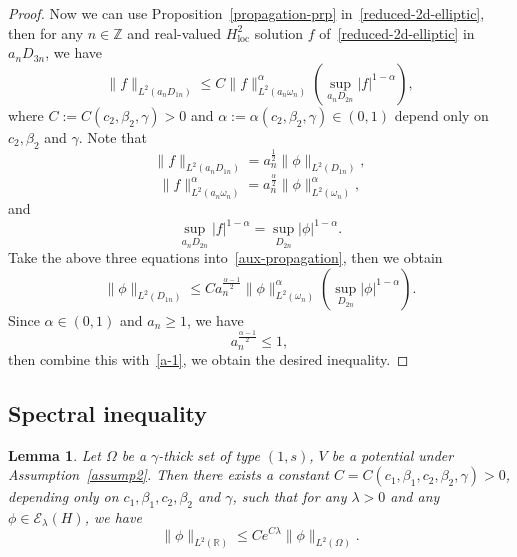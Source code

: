 \documentclass{amsart}
\newcommand\R{\ensuremath{\mathbb{R}}}
\newcommand\Z{\ensuremath{\mathbb{Z}}}
\newtheorem{lemma}[theorem]{Lemma}
\theoremstyle{definition}
\begin{document}
\begin{proof}
	Now we can use Proposition~\ref{propagation-prp} in~\eqref{reduced-2d-elliptic}, then for any $n\in \Z$ and real-valued $H^2_{\mathrm{loc}}$ solution $f$ of~\eqref{reduced-2d-elliptic} in $a_nD_{3n}$, we have
	\begin{equation}
		\|f\|_{L^2(a_nD_{1n})}\le C\|f\|^{\alpha}_{L^2(a_n\omega_n)}\left( \sup_{a_nD_{2n}}|f|^{1-\alpha} \right),\label{aux-propagation} 
	\end{equation}
	where $C:=C(c_2,\beta_2,\gamma)>0$ and $\alpha:=\alpha(c_2,\beta_2,\gamma)\in (0,1)$ depend only on $c_2,\beta_2$ and $\gamma$.
	Note that 
	\begin{equation}
		\|f\|_{L^2(a_nD_{1n})}=a_n^{\frac{1}{2}}\|\phi\|_{L^2(D_{1n})},
	\end{equation}
	\begin{equation}
		\|f\|^{\alpha}_{L^2(a_n \omega_n)}=a_n^{\frac{\alpha}{2}}\|\phi\|^{\alpha}_{L^2(\omega_n)},
	\end{equation}
	and
	\begin{equation}
		\sup_{a_nD_{2n}}|f|^{1-\alpha}=\sup_{D_{2n}}|\phi|^{1-\alpha}.
	\end{equation}
	Take the above three equations into~\eqref{aux-propagation}, then we obtain 
	\begin{equation}\label{a-1}
		\|\phi\|_{L^2(D_{1n})}\le C a_n^{\frac{\alpha-1}{2}}\|\phi\|^{\alpha}_{L^2(\omega_n)}\left( \sup_{D_{2n}}|\phi|^{1-\alpha} \right). 
	\end{equation}
	Since $\alpha\in (0,1)$ and $a_n\ge 1$, we have
	\begin{equation}
		a_n^{\frac{\alpha-1}{2}}\le 1,
	\end{equation}
	then combine this with~\eqref{a-1}, we obtain the desired inequality.
\end{proof}
\subsection{Spectral inequality}
\begin{lemma}\label{spectral-inequality}
	Let $\Omega$ be a $\gamma$-thick set of type $(1,s)$, $V$ be a potential under Assumption~\ref{assump2}. Then there exists a constant $C=C(c_1,\beta_1,c_2,\beta_2,\gamma)>0$, depending only on $c_1,\beta_1,c_2,\beta_2$ and $\gamma$, such that for any $\lambda>0$ and any $\phi \in \mathcal{E}_{\lambda}(H)$, we have
	\begin{equation}
		\|\phi\|_{L^2(\R)}\le C e^{C\lambda}\|\phi\|_{L^2(\Omega)}.
	\end{equation}
\end{lemma}
\end{document}
